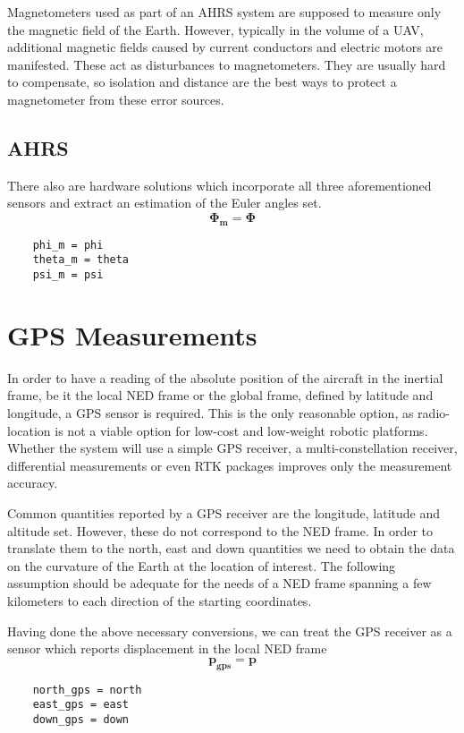 Magnetometers used as part of an AHRS system are supposed to measure only the magnetic field of the Earth. However, typically in the volume of a UAV, additional magnetic fields caused by current conductors and electric motors are manifested. These act as disturbances to magnetometers. They are usually hard to compensate, so isolation and distance are the best ways to protect a magnetometer from these error sources.

\subsection{AHRS}
There also are hardware solutions which incorporate all three aforementioned sensors and extract an estimation of the Euler angles set.
\begin{equation}
	\bm{\Phi_{m}} = \bm{\Phi}
\end{equation}
%
\begin{lstlisting}
	phi_m = phi
	theta_m = theta
	psi_m = psi
\end{lstlisting}

\section{GPS Measurements}
In order to have a reading of the absolute position of the aircraft in the inertial frame, be it the local NED frame or the global frame, defined by latitude and longitude, a GPS sensor is required. This is the only reasonable option, as radio-location is not a viable option for low-cost and low-weight robotic platforms. Whether the system will use a simple GPS receiver, a multi-constellation receiver, differential measurements or even RTK packages improves only the measurement accuracy.

Common quantities reported by a GPS receiver are the longitude, latitude and altitude set. However, these do not correspond to the NED frame. In order to translate them to the north, east and down quantities we need to obtain the data on the curvature of the Earth at the location of interest. The following assumption should be adequate for the needs of a NED frame spanning a few kilometers to each direction of the starting coordinates.

Having done the above necessary conversions, we can treat the GPS receiver as a sensor which reports displacement in the local NED frame
\begin{equation}
\bm{p_{gps}} = \bm{p}
\end{equation}
%
\begin{lstlisting}
	north_gps = north
	east_gps = east
	down_gps = down
\end{lstlisting}

